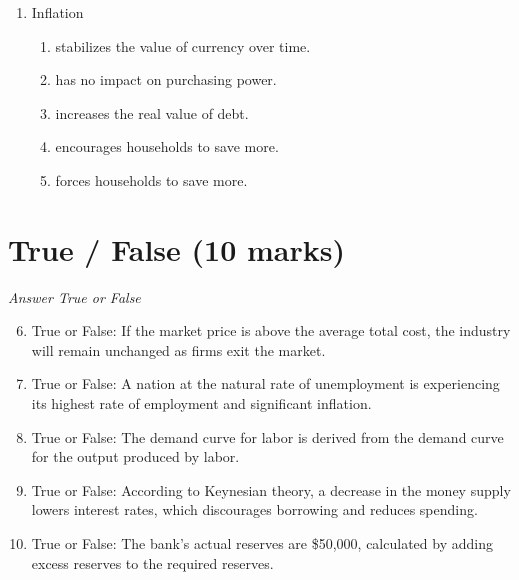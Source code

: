 \documentclass[12pt]{article}
\begin{document}
\begin{enumerate}[label=\arabic*.]
\begin{enumerate}[label=(\alph*)]
    \item Capitalism results in single authority
    \item Capitalism ensures job security
    \item Capitalism fosters cultural diversity
    \item Capitalism promotes personal freedom
    \item Capitalism encourages moral responsibility
\end{enumerate}
\item Inflation
\begin{enumerate}[label=(\alph*)]
    \item stabilizes the value of currency over time.
    \item has no impact on purchasing power.
    \item increases the real value of debt.
    \item encourages households to save more.
    \item forces households to save more.
\end{enumerate}
\end{enumerate}

\section*{True / False (10 marks)}
\textit{Answer True or False}
\begin{enumerate}[label=\arabic*.]
\setcounter{enumi}{5}
\item True or False: If the market price is above the average total cost, the industry will remain unchanged as firms exit the market.
\item True or False: A nation at the natural rate of unemployment is experiencing its highest rate of employment and significant inflation.
\item True or False: The demand curve for labor is derived from the demand curve for the output produced by labor.
\item True or False: According to Keynesian theory, a decrease in the money supply lowers interest rates, which discourages borrowing and reduces spending.
\item True or False: The bank's actual reserves are \$50,000, calculated by adding excess reserves to the required reserves.
\end{enumerate}
\end{document}
